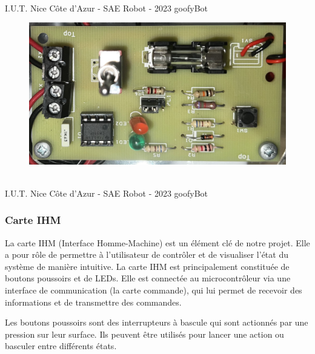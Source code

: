 \vfill
\noindent\makebox[\linewidth]{\rule{.8\paperwidth}{.6pt}}\\[0.2cm]
I.U.T. Nice Côte d'Azur - SAE Robot - 2023 \hfill goofyBot
\noindent\makebox[\linewidth]{\rule{.8\paperwidth}{.6pt}}
\newpage

\begin{figure}[H]
\centering
\begin{minipage}{.3\textwidth}
  \centering
  \centerline{\includegraphics[width=1\linewidth, angle = -90]{img/cartes/batterie.jpeg}}
  \label{fig:batterie}
\end{minipage}%
\end{figure}

\vfill
\noindent\makebox[\linewidth]{\rule{.8\paperwidth}{.6pt}}\\[0.2cm]
I.U.T. Nice Côte d'Azur - SAE Robot - 2023 \hfill goofyBot
\noindent\makebox[\linewidth]{\rule{.8\paperwidth}{.6pt}}
\newpage


\subsubsection{Carte IHM}

La carte IHM (Interface Homme-Machine) est un élément clé de notre projet. Elle a pour rôle de 
permettre à l'utilisateur de contrôler et de visualiser l'état du système de manière intuitive.
La carte IHM est principalement constituée de boutons poussoirs et de LEDs. Elle est connectée au microcontrôleur via une interface de communication (la carte commande), qui lui permet de recevoir des informations et de transmettre des commandes.

Les boutons poussoirs sont des interrupteurs à bascule qui sont actionnés par une pression sur leur surface. Ils peuvent être utilisés pour lancer une action ou basculer entre différents états. 


